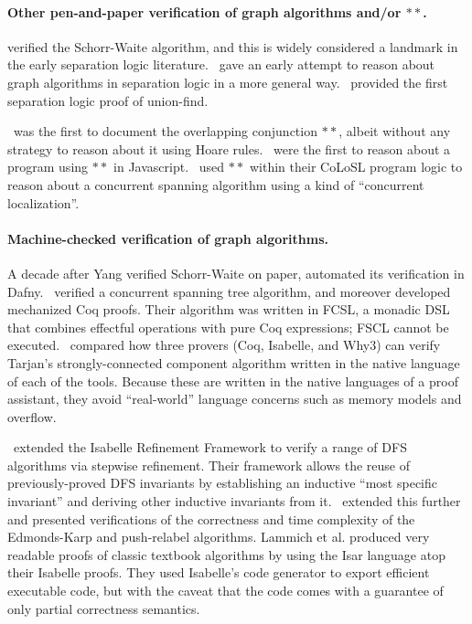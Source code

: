 \paragraph{Other pen-and-paper verification of graph algorithms and/or $**$.}

\citet{hongseok:phd} verified the Schorr-Waite algorithm, and this 
is widely considered a landmark in the early separation logic literature. 
\citet{bornat:aliasing04}~gave an early attempt to reason about graph algorithms 
in separation logic in a more general way. 
\citet{neelthesis}~provided the first separation logic proof of union-find.

\citet{rey-slnotes}~was the first to document the overlapping 
conjunction $**$, albeit without any strategy to reason about it using Hoare rules. 
\citet{gardnerms12}~were the first to reason about a program using $**$ in 
Javascript. 
\citet{raadvg15}~used $**$ within their CoLoSL program logic to reason about 
a concurrent spanning algorithm using a kind of ``concurrent localization''.


\paragraph{Machine-checked verification of graph algorithms.}
A decade after Yang verified Schorr-Waite on paper, \citet{leino10} automated 
its verification in Dafny. 
\citet{ilya-graphs}~verified a concurrent spanning tree algorithm, and 
moreover developed mechanized Coq proofs. Their algorithm was written in FCSL, 
a monadic DSL that combines effectful operations with pure Coq expressions; 
FSCL cannot be executed. 
\citet{chen18}~compared how three provers (Coq, Isabelle, and Why3) can 
verify Tarjan’s strongly-connected component algorithm written in the native 
language of each of the tools. Because these are written in the native languages 
of a proof assistant, they avoid “real-world” language concerns such as 
memory models and overflow.

\citet{lamneu15}~extended the Isabelle Refinement Framework to verify a range of 
DFS algorithms via stepwise refinement.
Their framework allows the reuse of previously-proved DFS 
invariants by establishing an inductive
``most specific invariant'' and deriving other inductive invariants from it.
\citet{lamsef19}~extended this further and presented verifications of 
the correctness and time complexity of the Edmonds-Karp and push-relabel
algorithms. Lammich et al. produced very readable proofs of classic 
textbook algorithms by using the Isar language atop their Isabelle proofs.
They used Isabelle's code generator to export efficient executable code, 
but with the caveat that the code comes with a guarantee of only 
partial correctness semantics.

